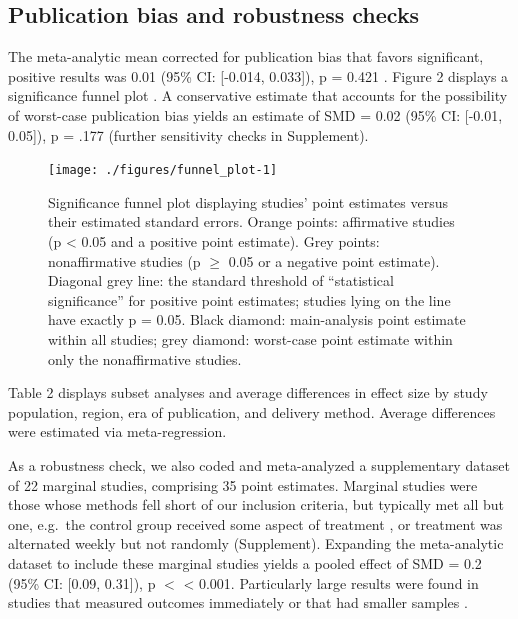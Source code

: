 \documentclass[preprint, 3p,
authoryear]{elsarticle} %
\begin{document}
\subsection{Publication bias and robustness checks}\label{Sec3.4}

The meta-analytic mean corrected for publication bias that favors
significant, positive results was 0.01 (95\% CI: {[}-0.014, 0.033{]}), p
= 0.421 \citep{hedges1992}. Figure 2 displays a significance funnel plot
\citep{mathur2020}. A conservative estimate that accounts for the
possibility of worst-case publication bias yields an estimate of SMD =
0.02 (95\% CI: {[}-0.01, 0.05{]}), p = .177
\citep{mathur2020, mathur2024} (further sensitivity checks in
Supplement).

\begin{figure}[H]

{\centering \texttt{[image: ./figures/funnel\_plot-1]} 

}

\caption{Significance funnel plot displaying studies’ point estimates versus their estimated standard errors. Orange points: affirmative studies (p < 0.05 and a positive point estimate). Grey points: nonaffirmative studies (p $\geq$ 0.05 or a negative point estimate). Diagonal grey line: the standard threshold of “statistical significance” for positive point estimates; studies lying on the line have exactly p = 0.05. Black diamond: main-analysis point estimate within all studies; grey diamond: worst-case point estimate within only the nonaffirmative studies.}\label{fig:funnel_plot}
\end{figure}

Table 2 displays subset analyses and average differences in effect size
by study population, region, era of publication, and delivery method.
Average differences were estimated via meta-regression.

As a robustness check, we also coded and meta-analyzed a supplementary
dataset of 22 marginal studies, comprising 35 point estimates. Marginal
studies were those whose methods fell short of our inclusion criteria,
but typically met all but one, e.g.~the control group received some
aspect of treatment \citep{piazza2022}, or treatment was alternated
weekly but not randomly \citep{garnett2020} (Supplement). Expanding the
meta-analytic dataset to include these marginal studies yields a pooled
effect of SMD = 0.2 (95\% CI: {[}0.09, 0.31{]}), p \(<\) \textless{}
0.001. Particularly large results were found in studies that measured
outcomes immediately \citep{hansen2021} or that had smaller samples
\citep{lentz2020}.
\end{document}
